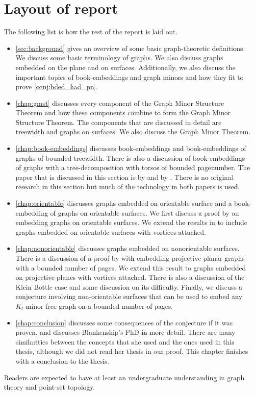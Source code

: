 \section{Layout of report}
The following list is how the rest of the report is laid out. 
\begin{itemize}
	\item \cref{sec:background} gives an overview of some basic graph-theoretic definitions. We discuss some basic terminology of graphs. We also discuss graphs embedded on the plane and on surfaces. Additionally, we also discuss the important topics of book-embeddings and graph minors and how they fit to prove \cref{conj:bded_had_pn}. 
	\item \cref{chap:gmst} discusses every component of the Graph Minor Structure Theorem and how these components combine to form the Graph Minor Structure Theorem. The components that are discussed in detail are treewidth and graphs on surfaces. We also discuss the Graph Minor Theorem. 
	\item \cref{chap:book-embeddings} discusses book-embeddings and book-embeddings of graphs of bounded treewidth. There is also a discussion of book-embeddings of graphs with a tree-decomposition with torsos of bounded pagenumber. The paper that is discussed in this section is by \textcite{hickingbothamStackNumberCliqueSum2023} and by \textcite{ganleyPagenumberTrees2001}. There is no original research in this section but much of the technology in both papers is used. 
	\item \cref{chap:orientable} discusses graphs embedded on orientable surface and a book-embedding of graphs on orientable surfaces. We first discuss a proof by \textcite{heathPagenumberGenusGraphs1992} on embedding graphs on orientable surfaces. We extend the results in \textcite{heathPagenumberGenusGraphs1992} to include graphs embedded on orientable surfaces with vortices attached. 
	\item \cref{chap:nonorientable} discusses graphs embedded on nonorientable surfaces. There is a discussion of a proof by \textcite{nakamotoBookEmbeddingProjectiveplanar2015} with embedding projective planar graphs with a bounded number of pages. We extend this result to graphs embedded on projective planes with vortices attached. There is also a discussion of the Klein Bottle case and some discussion on its difficulty. Finally, we discuss a conjecture involving non-orientable surfaces that can be used to embed any $K_t$-minor free graph on a bounded number of pages. 
	\item \cref{chap:conclusion} discusses some consequences of the conjecture if it was proven, and discusses Blankenship's PhD in more detail. There are many similarities between the concepts that she used and the ones used in this thesis, although we did not read her thesis in our proof. This chapter finishes with a conclusion to the thesis. 
\end{itemize}

Readers are expected to have at least an undergraduate understanding in graph theory and point-set topology. 
